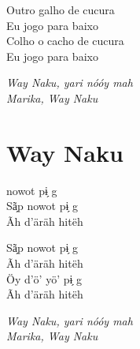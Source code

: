 \bigskip

\noindent Outro galho de cucura\\
Eu jogo para baixo\\
Colho o cacho de cucura\\
Eu jogo para baixo

\bigskip

\noindent \textit{Way Naku, yari nóóy mah\\
Marika, Way Naku}

\chapter{Way Naku}

 nowot pɨ̗ g\\
Sã̗p nowot pɨ̗ g\\
Ãh d’äräh hitëh

\bigskip

\noindent Sã̗p nowot pɨ̗ g\\
Ãh d’äräh hitëh\\
Öy d’ö’ yö’ pɨ̗ g\\
Ãh d’äräh hitëh

\bigskip

\noindent \textit{Way Naku, yari nóóy mah\\
Marika, Way Naku}


